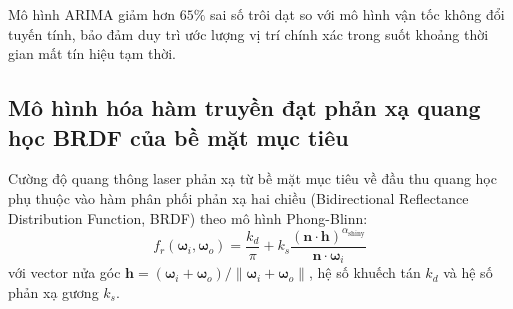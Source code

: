 \begin{table}[H]
\centering
\caption{So sánh sai số suy đoán vị trí ngắn hạn giữa mô hình ARIMA và bộ lọc vận tốc không đổi khi mất tín hiệu}
\label{tab:arima-vs-cv-dead-reckoning}
\end{table}

Mô hình ARIMA giảm hơn $65\%$ sai số trôi dạt so với mô hình vận tốc không đổi tuyến tính, bảo đảm duy trì ước lượng vị trí chính xác trong suốt khoảng thời gian mất tín hiệu tạm thời.

\subsection{Mô hình hóa hàm truyền đạt phản xạ quang học BRDF của bề mặt mục tiêu}

\hspace{0.5cm} Cường độ quang thông laser phản xạ từ bề mặt mục tiêu về đầu thu quang học phụ thuộc vào hàm phân phối phản xạ hai chiều (Bidirectional Reflectance Distribution Function, BRDF) theo mô hình Phong-Blinn:
\begin{equation}
f_r(\boldsymbol{\omega}_i, \boldsymbol{\omega}_o) = \frac{k_d}{\pi} + k_s \frac{(\mathbf{n} \cdot \mathbf{h})^{\alpha_{\text{shiny}}}}{\mathbf{n} \cdot \boldsymbol{\omega}_i}
\label{eq:brdf-phong-blinn-formula}
\end{equation}
với vector nửa góc $\mathbf{h} = (\boldsymbol{\omega}_i + \boldsymbol{\omega}_o)/\|\boldsymbol{\omega}_i + \boldsymbol{\omega}_o\|$, hệ số khuếch tán $k_d$ và hệ số phản xạ gương $k_s$.

